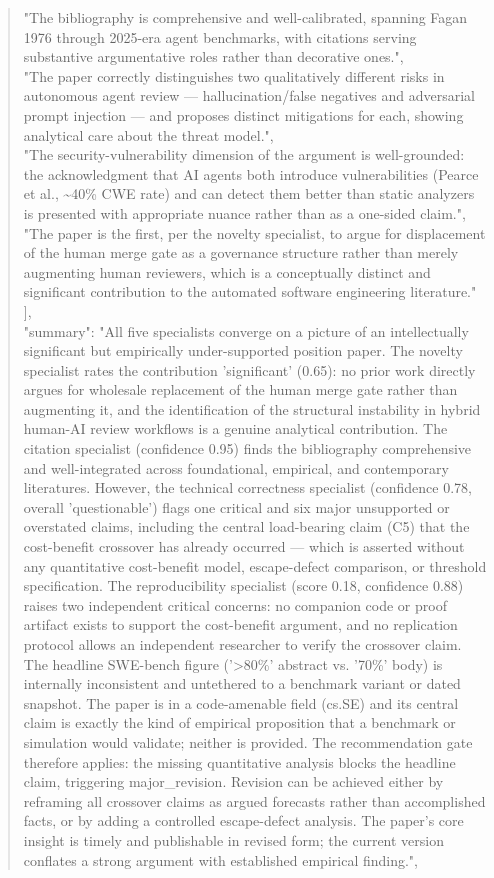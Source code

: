 \documentclass[11pt]{article}
\begin{document}
\begin{quote}
    "The bibliography is comprehensive and well-calibrated, spanning Fagan 1976 through 2025-era agent benchmarks, with citations serving substantive argumentative roles rather than decorative ones.",\\
    "The paper correctly distinguishes two qualitatively different risks in autonomous agent review --- hallucination/false negatives and adversarial prompt injection --- and proposes distinct mitigations for each, showing analytical care about the threat model.",\\
    "The security-vulnerability dimension of the argument is well-grounded: the acknowledgment that AI agents both introduce vulnerabilities (Pearce et al., \~{}40\% CWE rate) and can detect them better than static analyzers is presented with appropriate nuance rather than as a one-sided claim.",\\
    "The paper is the first, per the novelty specialist, to argue for displacement of the human merge gate as a governance structure rather than merely augmenting human reviewers, which is a conceptually distinct and significant contribution to the automated software engineering literature."\\
  ],\\
  "summary": "All five specialists converge on a picture of an intellectually significant but empirically under-supported position paper. The novelty specialist rates the contribution 'significant' (0.65): no prior work directly argues for wholesale replacement of the human merge gate rather than augmenting it, and the identification of the structural instability in hybrid human-AI review workflows is a genuine analytical contribution. The citation specialist (confidence 0.95) finds the bibliography comprehensive and well-integrated across foundational, empirical, and contemporary literatures. However, the technical correctness specialist (confidence 0.78, overall 'questionable') flags one critical and six major unsupported or overstated claims, including the central load-bearing claim (C5) that the cost-benefit crossover has already occurred --- which is asserted without any quantitative cost-benefit model, escape-defect comparison, or threshold specification. The reproducibility specialist (score 0.18, confidence 0.88) raises two independent critical concerns: no companion code or proof artifact exists to support the cost-benefit argument, and no replication protocol allows an independent researcher to verify the crossover claim. The headline SWE-bench figure ('>80\%' abstract vs. '70\%' body) is internally inconsistent and untethered to a benchmark variant or dated snapshot. The paper is in a code-amenable field (cs.SE) and its central claim is exactly the kind of empirical proposition that a benchmark or simulation would validate; neither is provided. The recommendation gate therefore applies: the missing quantitative analysis blocks the headline claim, triggering major\_revision. Revision can be achieved either by reframing all crossover claims as argued forecasts rather than accomplished facts, or by adding a controlled escape-defect analysis. The paper's core insight is timely and publishable in revised form; the current version conflates a strong argument with established empirical finding.",\\

\end{quote}
\end{document}
